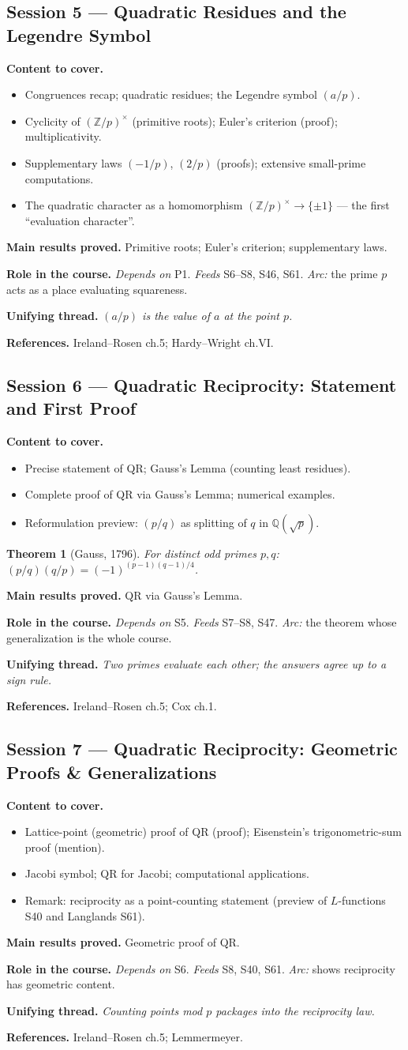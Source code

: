 \documentclass[11pt,a4paper]{article}
\newtheorem*{theorem*}{Theorem}
\newcommand{\sess}[2]{\subsection[#1. #2]{Session #1 --- #2}}
\newcommand{\chead}{\par\smallskip\noindent\textbf{Content to cover.}}
\newcommand{\proved}[1]{\par\smallskip\noindent\textbf{Main results proved.} #1}
\newcommand{\role}[1]{\par\smallskip\noindent\textbf{Role in the course.} #1}
\newcommand{\thread}[1]{\par\smallskip\noindent\textbf{Unifying thread.} \textit{#1}}
\newcommand{\srefs}[1]{\par\smallskip\noindent\textbf{References.} #1}
\newcommand{\Z}{\mathbb{Z}}
\newcommand{\Q}{\mathbb{Q}}
\begin{document}
	\sess{5}{Quadratic Residues and the Legendre Symbol}
	\chead
	\begin{itemize}
		\item Congruences recap; quadratic residues; the Legendre symbol $(a/p)$.
		\item Cyclicity of $(\Z/p)^\times$ (primitive roots); Euler's criterion (proof); multiplicativity.
		\item Supplementary laws $(-1/p)$, $(2/p)$ (proofs); extensive small-prime computations.
		\item The quadratic character as a homomorphism $(\Z/p)^\times\to\{\pm1\}$ --- the first ``evaluation character''.
	\end{itemize}
	\proved{Primitive roots; Euler's criterion; supplementary laws.}
	\role{\emph{Depends on} P1. \emph{Feeds} S6--S8, S46, S61. \emph{Arc:} the prime $p$ acts as a place evaluating squareness.}
	\thread{$(a/p)$ is the value of $a$ at the point $p$.}
	\srefs{Ireland--Rosen ch.5; Hardy--Wright ch.VI.}
	
	\sess{6}{Quadratic Reciprocity: Statement and First Proof}
	\chead
	\begin{itemize}
		\item Precise statement of QR; Gauss's Lemma (counting least residues).
		\item Complete proof of QR via Gauss's Lemma; numerical examples.
		\item Reformulation preview: $(p/q)$ as splitting of $q$ in $\Q(\sqrt p)$.
	\end{itemize}
	\begin{theorem*}[Gauss, 1796] For distinct odd primes $p,q$: $(p/q)(q/p)=(-1)^{(p-1)(q-1)/4}$.
	\end{theorem*}
	\proved{QR via Gauss's Lemma.}
	\role{\emph{Depends on} S5. \emph{Feeds} S7--S8, S47. \emph{Arc:} the theorem whose generalization is the whole course.}
	\thread{Two primes evaluate each other; the answers agree up to a sign rule.}
	\srefs{Ireland--Rosen ch.5; Cox ch.1.}
	
	\sess{7}{Quadratic Reciprocity: Geometric Proofs \& Generalizations}
	\chead
	\begin{itemize}
		\item Lattice-point (geometric) proof of QR (proof); Eisenstein's trigonometric-sum proof (mention).
		\item Jacobi symbol; QR for Jacobi; computational applications.
		\item Remark: reciprocity as a point-counting statement (preview of $L$-functions S40 and Langlands S61).
	\end{itemize}
	\proved{Geometric proof of QR.}
	\role{\emph{Depends on} S6. \emph{Feeds} S8, S40, S61. \emph{Arc:} shows reciprocity has geometric content.}
	\thread{Counting points mod $p$ packages into the reciprocity law.}
	\srefs{Ireland--Rosen ch.5; Lemmermeyer.}
	
\end{document}
